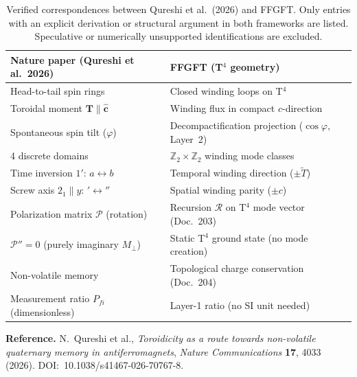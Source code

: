 \begin{table}[htbp]
\centering
\caption{Verified correspondences between Qureshi et al.\ (2026) and FFGFT.
Only entries with an explicit derivation or structural argument in both
frameworks are listed. Speculative or numerically unsupported identifications
are excluded.}
\label{tab:correspondence}
\begin{tabular}{ll}
\toprule
\textbf{Nature paper (Qureshi et al.\ 2026)} & \textbf{FFGFT (T$^4$ geometry)} \\
\midrule
Head-to-tail spin rings & Closed winding loops on T$^4$ \\
Toroidal moment $\mathbf{T}\parallel\hat{\mathbf{c}}$ &
  Winding flux in compact $c$-direction \\
Spontaneous spin tilt ($\varphi$) &
  Decompactification projection ($\cos\varphi$, Layer~2) \\
4 discrete domains &
  $\mathbb{Z}_2\times\mathbb{Z}_2$ winding mode classes \\
Time inversion $1'$: $a\leftrightarrow b$ &
  Temporal winding direction ($\pm\tilde{T}$) \\
Screw axis $2_1\|y$: $'\leftrightarrow''$ &
  Spatial winding parity ($\pm c$) \\
Polarization matrix $\mathcal{P}$ (rotation) &
  Recursion $\mathcal{R}$ on T$^4$ mode vector (Doc.~203) \\
$\mathcal{P}''=0$ (purely imaginary $M_\perp$) &
  Static T$^4$ ground state (no mode creation) \\
Non-volatile memory &
  Topological charge conservation (Doc.~204) \\
Measurement ratio $P_{fi}$ (dimensionless) &
  Layer-1 ratio (no SI unit needed) \\
\bottomrule
\end{tabular}
\end{table}

\noindent\textbf{Reference.} N.~Qureshi et al., \textit{Toroidicity as a
route towards non-volatile quaternary memory in antiferromagnets},
\textit{Nature Communications} \textbf{17}, 4033 (2026).
DOI:~10.1038/s41467-026-70767-8.
